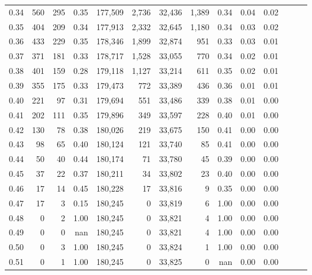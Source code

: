 \begin{tabular}{rrrrrrrrrrrrrr}
0.34 &     560 &    295 &  0.35 &  177,509 &    2,736 &  32,436 &   1,389 &  0.34 &  0.04 &      0.02 \\
0.35 &     404 &    209 &  0.34 &  177,913 &    2,332 &  32,645 &   1,180 &  0.34 &  0.03 &      0.02 \\
0.36 &     433 &    229 &  0.35 &  178,346 &    1,899 &  32,874 &     951 &  0.33 &  0.03 &      0.01 \\
0.37 &     371 &    181 &  0.33 &  178,717 &    1,528 &  33,055 &     770 &  0.34 &  0.02 &      0.01 \\
0.38 &     401 &    159 &  0.28 &  179,118 &    1,127 &  33,214 &     611 &  0.35 &  0.02 &      0.01 \\
0.39 &     355 &    175 &  0.33 &  179,473 &      772 &  33,389 &     436 &  0.36 &  0.01 &      0.01 \\
0.40 &     221 &     97 &  0.31 &  179,694 &      551 &  33,486 &     339 &  0.38 &  0.01 &      0.00 \\
0.41 &     202 &    111 &  0.35 &  179,896 &      349 &  33,597 &     228 &  0.40 &  0.01 &      0.00 \\
0.42 &     130 &     78 &  0.38 &  180,026 &      219 &  33,675 &     150 &  0.41 &  0.00 &      0.00 \\
0.43 &      98 &     65 &  0.40 &  180,124 &      121 &  33,740 &      85 &  0.41 &  0.00 &      0.00 \\
0.44 &      50 &     40 &  0.44 &  180,174 &       71 &  33,780 &      45 &  0.39 &  0.00 &      0.00 \\
0.45 &      37 &     22 &  0.37 &  180,211 &       34 &  33,802 &      23 &  0.40 &  0.00 &      0.00 \\
0.46 &      17 &     14 &  0.45 &  180,228 &       17 &  33,816 &       9 &  0.35 &  0.00 &      0.00 \\
0.47 &      17 &      3 &  0.15 &  180,245 &        0 &  33,819 &       6 &  1.00 &  0.00 &      0.00 \\
0.48 &       0 &      2 &  1.00 &  180,245 &        0 &  33,821 &       4 &  1.00 &  0.00 &      0.00 \\
0.49 &       0 &      0 &   nan &  180,245 &        0 &  33,821 &       4 &  1.00 &  0.00 &      0.00 \\
0.50 &       0 &      3 &  1.00 &  180,245 &        0 &  33,824 &       1 &  1.00 &  0.00 &      0.00 \\
0.51 &       0 &      1 &  1.00 &  180,245 &        0 &  33,825 &       0 &   nan &  0.00 &      0.00 \\

\end{tabular}

